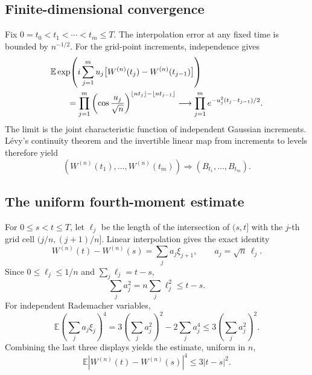 \documentclass[10pt,a4paper]{article}
\numberwithin{equation}{section}
\theoremstyle{blueplain}
\theoremstyle{definition}
\newcommand{\E}{\mathbb E}
\begin{document}
\subsection{Finite-dimensional convergence}

Fix \(0=t_0<t_1<\cdots<t_m\le T\).  The interpolation error at any fixed
time is bounded by \(n^{-1/2}\).  For the grid-point increments, independence
gives
\begin{align}
 &\E\exp\!\left(
 i\sum_{j=1}^m u_j
 \bigl[W^{(n)}(t_j)-W^{(n)}(t_{j-1})\bigr]
 \right)\notag\\
 &\qquad=
 \prod_{j=1}^m
 \left(\cos\frac{u_j}{\sqrt n}\right)^{
   \lfloor nt_j\rfloor-\lfloor nt_{j-1}\rfloor}
 \longrightarrow
 \prod_{j=1}^m e^{-u_j^2(t_j-t_{j-1})/2}.
 \label{eq:donsker-joint-cf}
\end{align}
The limit is the joint characteristic function of independent Gaussian
increments.  L\'evy's continuity theorem and the invertible linear map from
increments to levels therefore yield
\begin{equation}
 (W^{(n)}(t_1),\ldots,W^{(n)}(t_m))
 \Rightarrow(B_{t_1},\ldots,B_{t_m}).
 \label{eq:donsker-fdds}
\end{equation}

\subsection{The uniform fourth-moment estimate}

For \(0\le s<t\le T\), let
\(\ell_j\) be the length of the intersection of \((s,t]\) with the
\(j\)-th grid cell \((j/n,(j+1)/n]\).  Linear interpolation gives the exact
identity
\begin{equation}
  W^{(n)}(t)-W^{(n)}(s)
  =\sum_j a_j\xi_{j+1},
  \qquad a_j=\sqrt n\,\ell_j.
  \label{eq:donsker-cell-decomposition}
\end{equation}
Since \(0\le\ell_j\le1/n\) and \(\sum_j\ell_j=t-s\),
\begin{equation}
  \sum_j a_j^2=n\sum_j\ell_j^2\le t-s.
  \label{eq:donsker-coefficient-bound}
\end{equation}
For independent Rademacher variables,
\begin{equation}
 \E\left(\sum_j a_j\xi_j\right)^4
 =3\left(\sum_j a_j^2\right)^2-2\sum_j a_j^4
 \le3\left(\sum_j a_j^2\right)^2.
 \label{eq:rademacher-fourth-moment}
\end{equation}
Combining the last three displays yields the estimate, uniform in \(n\),
\begin{equation}
  \boxed{\quad
  \E|W^{(n)}(t)-W^{(n)}(s)|^4\le3|t-s|^2.
  \quad}
  \label{eq:donsker-fourth-bound}
\end{equation}
\end{document}
